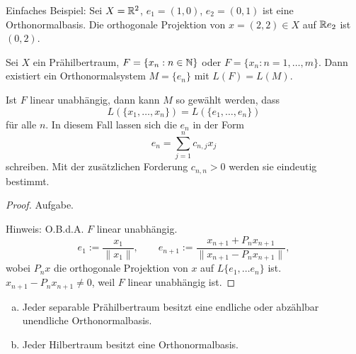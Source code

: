 Einfaches Beispiel: Sei $X = \mathbb{R}^2$, $e_1 = (1,0)$, $e_2 = (0,1)$ ist eine
Orthonormalbasis. Die orthogonale Projektion von $x = (2,2) \in X$ auf $\mathbb{R}
e_2$ ist $(0,2)$.

\begin{thm} %
  Sei $X$ ein Prähilbertraum, $F = \{ x_n : n \in \mathbb{N} \}$ oder $F = \{ x_n : n
  = 1, \ldots, m \}$.
  Dann existiert ein Orthonormalsystem $M = \{ e_n \}$ mit $L(F) = L(M)$.

  Ist $F$ linear unabhängig, dann kann $M$ so gewählt werden, dass
  \[ L(\{x_1, \ldots, x_n\}) = L( \{e_1, \ldots, e_n\}) \]
  für alle $n$. In diesem Fall lassen sich die $e_n$ in der Form
  \[ e_n = \sum_{j=1}^n c_{n,j} x_j \]
  schreiben. Mit der zusätzlichen Forderung $c_{n,n} > 0$ werden sie eindeutig
  bestimmt. 
\end{thm}

\begin{proof}
  Aufgabe.

  Hinweis: O.B.d.A. $F$ linear unabhängig.
  \[ e_1 := \frac{x_1}{\| x_1 \|}, \qquad
    e_{n+1} := \frac{x_{n+1} + P_n x_{n+1}}{ \| x_{n+1} - P_n x_{n+1} \|}, \]
wobei $P_n x$ die orthogonale Projektion von $x$ auf $L\{ e_1, \ldots e_n\}$
ist. $x_{n+1} - P_n x_{n+1} \ne 0$, weil $F$ linear unabhängig ist.
\end{proof}

\clearpage

\begin{thm} %
  \begin{enumerate}[a)]
  \item Jeder separable Prähilbertraum besitzt eine endliche oder abzählbar
    unendliche Orthonormalbasis.
  \item Jeder Hilbertraum besitzt eine Orthonormalbasis.
  \end{enumerate}
\end{thm}

